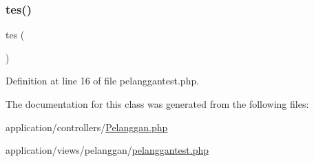 \subsubsection{\texorpdfstring{tes()}{tes()}}
{\footnotesize\ttfamily tes (\begin{DoxyParamCaption}{ }\end{DoxyParamCaption})}



Definition at line 16 of file pelanggantest.\+php.



The documentation for this class was generated from the following files\+:\begin{DoxyCompactItemize}
\item 
application/controllers/\mbox{\hyperlink{_pelanggan_8php}{Pelanggan.\+php}}\item 
application/views/pelanggan/\mbox{\hyperlink{pelanggantest_8php}{pelanggantest.\+php}}\end{DoxyCompactItemize}
